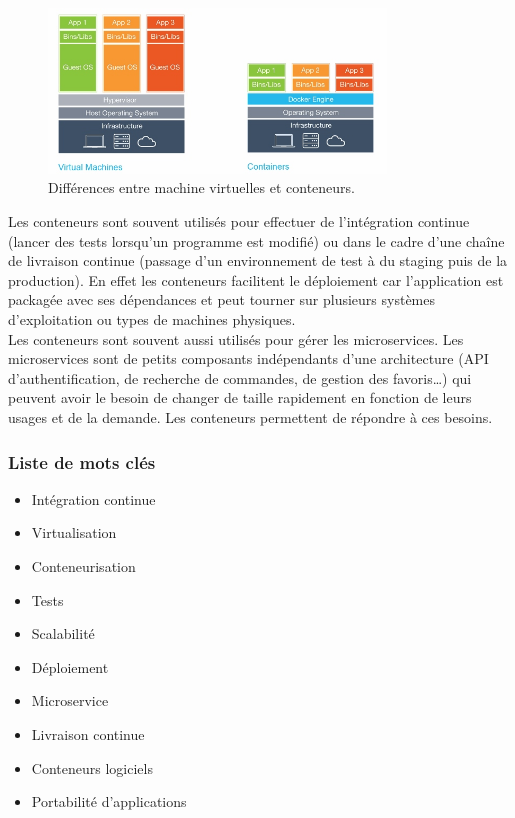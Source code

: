     \begin{figure}[h]
      \centering
      \includegraphics[width=0.8\textwidth]{images/vms-containers.jpg}
      \caption{Différences entre machine virtuelles et conteneurs.\cite{whatIsDocker}}
      \label{fig:vms-containers}
    \end{figure}

    Les conteneurs sont souvent utilisés pour effectuer de l'intégration continue (lancer des tests lorsqu'un programme est modifié) ou dans le cadre d'une chaîne de livraison continue (passage d'un environnement de test à du staging puis de la production). En effet les conteneurs facilitent le déploiement car l'application est packagée avec ses dépendances et peut tourner sur plusieurs systèmes d'exploitation ou types de machines physiques.\\

    Les conteneurs sont souvent aussi utilisés pour gérer les microservices. Les microservices sont de petits composants indépendants d'une architecture (API d'authentification, de recherche de commandes, de gestion des favoris\dots) qui peuvent avoir le besoin de changer de taille rapidement en fonction de leurs usages et de la demande. Les conteneurs permettent de répondre à ces besoins.

    \subsubsection*{Liste de mots clés}
        \begin{itemize}
            \item Intégration continue
            \item Virtualisation
            \item Conteneurisation
            \item Tests
            \item Scalabilité
            \item Déploiement
            \item Microservice
            \item Livraison continue
            \item Conteneurs logiciels
            \item Portabilité d'applications
        \end{itemize}

